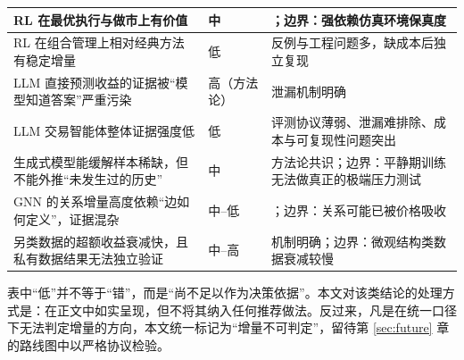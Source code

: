 \begin{table}[htbp]
\begin{tabular}{@{}>{\raggedright\arraybackslash}p{6.6cm}>{\raggedright\arraybackslash}p{1.6cm}>{\raggedright\arraybackslash}p{6.6cm}@{}}
\midrule
RL 在最优执行与做市上有价值 & 中 & \cite{nevmyvaka2006,guant2019,spooner2018}；边界：强依赖仿真环境保真度 \\
\midrule
RL 在组合管理上相对经典方法有稳定增量 & 低 & 反例与工程问题多，缺成本后独立复现 \\
\midrule
LLM 直接预测收益的证据被“模型知道答案”严重污染 & 高（方法论） & 泄漏机制明确\cite{lookaheadbias2023,honesteval2026} \\
\midrule
LLM 交易智能体整体证据强度低 & 低 & 评测协议薄弱、泄漏难排除、成本与可复现性问题突出\cite{lmasurvey2024} \\
\midrule
生成式模型能缓解样本稀缺，但不能外推“未发生过的历史” & 中 & 方法论共识；边界：平静期训练无法做真正的极端压力测试 \\
\midrule
GNN 的关系增量高度依赖“边如何定义”，证据混杂 & 中--低 & \cite{feng2019rsr,xu2021hats}；边界：关系可能已被价格吸收 \\
\midrule
另类数据的超额收益衰减快，且私有数据结果无法独立验证 & 中--高 & 机制明确；边界：微观结构类数据衰减较慢 \\
\bottomrule
\end{tabular}
\end{table}

\noindent 表中“低”并不等于“错”，而是“尚不足以作为决策依据”。本文对该类结论的处理方式是：在正文中如实呈现，但不将其纳入任何推荐做法。反过来，凡是在统一口径下无法判定增量的方向，本文统一标记为“增量不可判定”，留待第 \ref{sec:future} 章的路线图中以严格协议检验。
